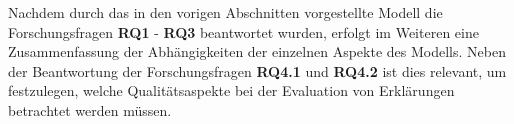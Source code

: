 \bigskip

Nachdem durch das in den vorigen Abschnitten vorgestellte Modell die Forschungsfragen \textbf{RQ1} - \textbf{RQ3} beantwortet wurden, erfolgt im Weiteren eine Zusammenfassung der Abhängigkeiten der einzelnen Aspekte des Modells. Neben der Beantwortung der Forschungsfragen \textbf{RQ4.1} und \textbf{RQ4.2} ist dies relevant, um festzulegen, welche Qualitätsaspekte bei der Evaluation von Erklärungen betrachtet werden müssen.